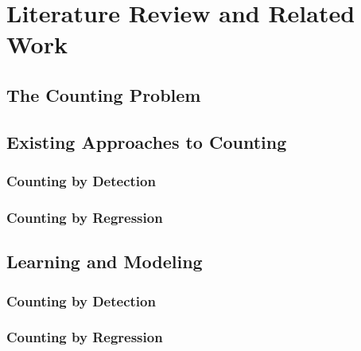 \def\baselinestretch{1}

\chapter{Literature Review and Related Work}

\def\baselinestretch{1.66}




\smallskip

\goodbreak
\section{The Counting Problem}

\bigskip

\goodbreak

\section{Existing Approaches to Counting}
\subsection{Counting by Detection}
\subsection{Counting by Regression}


\bigskip

\goodbreak

\section{Learning and Modeling}
\subsection{Counting by Detection}
\subsection{Counting by Regression}


\bigskip


